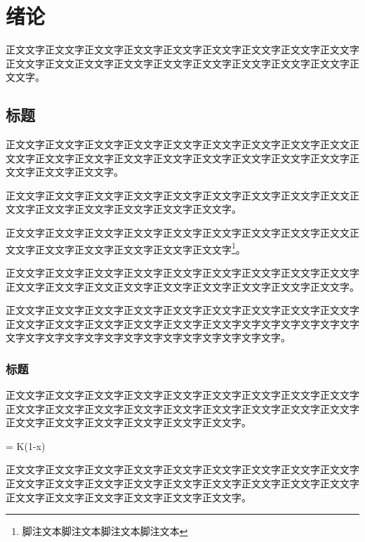 

\chapter{绪论}

正文文字正文文字正文文字正文文字正文文字正文文字正文文字正文文字正文文字正文文字正文文正文文字正文文字正文文字正文文字正文文字正文文字正文文字正文文字。

\section{标题}

正文文字正文文字正文文字正文文字正文文字正文文字正文文字正文文字正文文正文文字正文文字正文文字正文文字正文文字正文文字正文文字正文文字正文文字正文文字正文文字正文文字。

正文文字正文文字正文文字正文文字正文文字正文文字正文文字正文文字正文文正文文字正文文字正文文字正文文字正文文字正文文字。

正文文字正文文字正文文字正文文字正文文字正文文字正文文字正文文字正文文正文文字正文文字正文文字正文文字正文文字正文文字\footnote{脚注文本脚注文本脚注文本脚注文本}。

正文文字正文文字正文文字正文文字正文文字正文文字正文文字正文文字正文文字正文文字正文文字正文文正文文字正文文字正文文字正文文字正文文字正文文字。




正文文字正文文字正文文字正文文字正文文字正文文字正文文字正文文字正文文字正文文字正文文字正文文字正文文字正文文字正文文字文字文字文字文字文字文字文字文字文字文字文字文字文字文字文字文字文字文字文字文字。

\subsection{标题}

正文文字正文文字正文文字正文文字正文文字正文文字正文文字正文文字正文文字正文文字正文文字正文文字正文文字正文文字正文文字正文文字正文文字正文文字正文文字正文文字正文文字正文文字正文文字正文文字。
\begin{thesisequation}
   = K(1-x)
  \label{eq:example}
\end{thesisequation}

正文文字正文文字正文文字正文文字正文文字正文文字正文文字正文文字正文文字正文文字正文文字正文文字正文文字正文文字正文文字正文文字正文文字正文文字正文文字正文文字正文文字正文文字正文文字正文文字。

